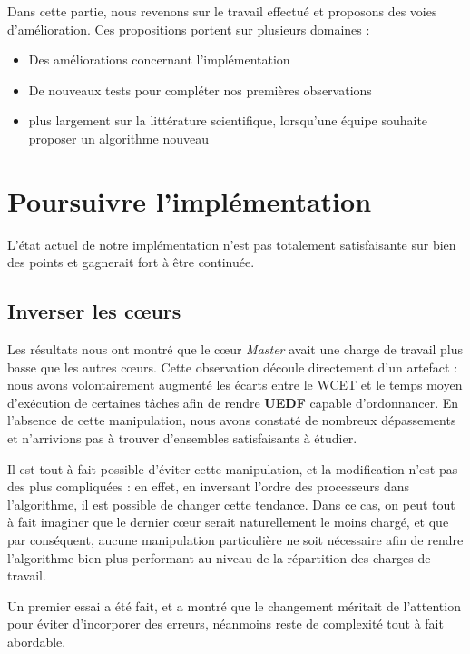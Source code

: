 \label{perspectives}
Dans cette partie, nous revenons sur le travail effectué et proposons des voies d'amélioration.
Ces propositions portent sur plusieurs domaines :
\begin{itemize}
	\item Des améliorations concernant l'implémentation
	\item De nouveaux tests pour compléter nos premières observations
	\item plus largement sur la littérature scientifique, lorsqu'une équipe souhaite proposer un algorithme nouveau
\end{itemize}

\section{Poursuivre l'implémentation}

	L'état actuel de notre implémentation n'est pas totalement satisfaisante sur bien des points et 
	gagnerait fort à être continuée.
	
	\subsection{Inverser les cœurs}
		Les résultats nous ont montré que le cœur \textit{Master} avait une charge de travail plus basse que les 
		autres cœurs. Cette observation découle directement d'un artefact : nous avons volontairement augmenté les 
		écarts entre le WCET et le temps moyen d'exécution de certaines tâches afin de rendre \textbf{UEDF} capable 
		d'ordonnancer. En l'absence de cette manipulation, nous avons constaté de nombreux dépassements et n'arrivions pas 
		à trouver d'ensembles satisfaisants à étudier.\newline
		
		Il est tout à fait possible d'éviter cette manipulation, et la modification n'est pas des plus compliquées : 
		en effet, en inversant l'ordre des processeurs dans l'algorithme, il est possible de changer cette tendance. 
		Dans ce cas, on peut tout à fait imaginer que le dernier cœur serait naturellement le moins chargé, et que par 
		conséquent, aucune manipulation particulière ne soit nécessaire afin de rendre l'algorithme bien plus performant au 
		niveau de la répartition des charges de travail.\newline
		
		Un premier essai a été fait, et a montré que le changement méritait de l'attention pour éviter d'incorporer des 
		erreurs, néanmoins reste de complexité tout à fait abordable.
		

